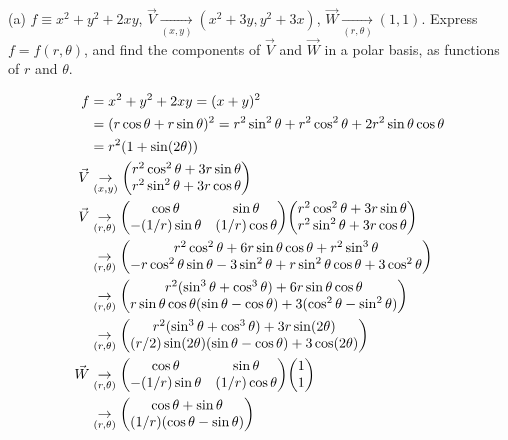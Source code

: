 \documentclass[gr-notes.tex]{subfiles}
\begin{document}
(a)
$f \equiv x^2 + y^2 + 2xy$, $\vec{V} \underset{(x,y)}{\to} (x^2 + 3y, y^2 + 3x)$, $\vec{W} \underset{(r,\theta)}{\to} (1, 1)$. Express $f = f(r, \theta)$, and find the components of $\vec{V}$ and $\vec{W}$ in a polar basis, as functions of $r$ and $\theta$.

\begin{align*}
  f &= x^2 + y^2 + 2xy = (x + y)^2
  \\ &=
  (r \cos\theta + r \sin\theta)^2 =
  r^2 \sin^2\theta + r^2 \cos^2\theta + 2 r^2 \sin\theta \cos\theta
  \\ &=
  r^2 (1 + \sin(2 \theta))
  \\
  \vec{V} &\underset{(x,y)}{\to}
  \mqty( r^2 \cos^2\theta + 3 r \sin\theta \\
         r^2 \sin^2\theta + 3 r \cos\theta )
  \\
  \vec{V} &\underset{(r,\theta)}{\to}
  \mqty( \cos\theta & \sin\theta \\
         -(1/r) \sin\theta & (1/r) \cos\theta )
  \mqty( r^2 \cos^2\theta + 3 r \sin\theta \\
         r^2 \sin^2\theta + 3 r \cos\theta )
  \\ &\underset{(r,\theta)}{\to}
  \mqty(
    r^2 \cos^2\theta + 6 r \sin\theta \cos\theta + r^2 \sin^3\theta
    \\
    -r \cos^2\theta \sin\theta - 3 \sin^2\theta +
     r \sin^2\theta \cos\theta + 3 \cos^2\theta
  )
  \\ &\underset{(r,\theta)}{\to}
  \mqty(
    r^2 (\sin^3\theta + \cos^3\theta) + 6 r \sin\theta \cos\theta
    \\
    r \sin\theta \cos\theta (\sin\theta - \cos\theta) +
    3 (\cos^2\theta - \sin^2\theta)
  )
  \\ &\underset{(r,\theta)}{\to}
  \mqty(
    r^2 (\sin^3\theta + \cos^3\theta) + 3 r \sin(2\theta)
    \\
    (r/2) \sin(2\theta) (\sin\theta - \cos\theta) + 3 \cos(2\theta)
  )
  \\
  \vec{W} &\underset{(r,\theta)}{\to}
  \mqty( \cos\theta & \sin\theta \\
         -(1/r) \sin\theta & (1/r) \cos\theta )
  \mqty( 1 \\ 1 )
  \\ &\underset{(r,\theta)}{\to}
  \mqty(
    \cos\theta + \sin\theta
    \\
    (1/r) (\cos\theta - \sin\theta)
  )
\end{align*}
\end{document}
